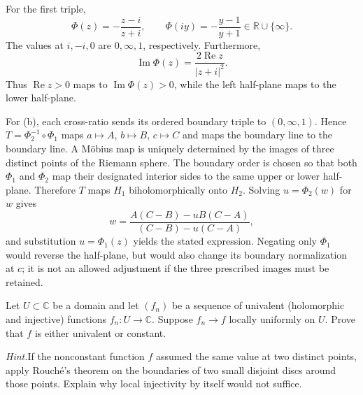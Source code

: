 \begin{solution}
For the first triple,
\[
\Phi(z)=-\frac{z-i}{z+i},\qquad
\Phi(iy)=-\frac{y-1}{y+1}\in\mathbb R\cup\{\infty\}.
\]
The values at $i,-i,0$ are $0,\infty,1$, respectively.
Furthermore,
\[
\operatorname{Im}\Phi(z)=\frac{2\operatorname{Re}z}{|z+i|^2}.
\]
Thus $\operatorname{Re}z>0$ maps to $\operatorname{Im}\Phi(z)>0$,
while the left half-plane maps to the lower half-plane.

For (b), each cross-ratio sends its ordered boundary triple to
$(0,\infty,1)$. Hence $T=\Phi_2^{-1}\circ\Phi_1$ maps
$a\mapsto A$, $b\mapsto B$, $c\mapsto C$ and maps the boundary
line to the boundary line. A M\"obius map is uniquely determined
by the images of three distinct points of the Riemann sphere.
The boundary order is chosen so that both $\Phi_1$ and $\Phi_2$
map their designated interior sides to the same upper or lower
half-plane. Therefore $T$ maps $H_1$ biholomorphically onto $H_2$.
Solving $u=\Phi_2(w)$ for $w$ gives
\[
w=\frac{A(C-B)-uB(C-A)}{(C-B)-u(C-A)},
\]
and substitution $u=\Phi_1(z)$ yields the stated expression.
Negating only $\Phi_1$ would reverse the half-plane, but would also
change its boundary normalization at $c$; it is not an allowed adjustment
if the three prescribed images must be retained.
\end{solution}


\begin{problem}[CP-IV-0037]
\label{prob:cp-iv-0037}
Let $U\subset\mathbb C$ be a domain and let $(f_n)$ be a sequence
of univalent (holomorphic and injective) functions $f_n:U\to\mathbb C$.
Suppose $f_n\to f$ locally uniformly on $U$.
Prove that $f$ is either univalent or constant.

\par\noindent\textit{Hint.}\quad If the nonconstant function $f$ assumed the
same value at two distinct points, apply Rouch\'e's theorem on the
boundaries of two small disjoint discs around those points.
Explain why local injectivity by itself would not suffice.
\end{problem}



